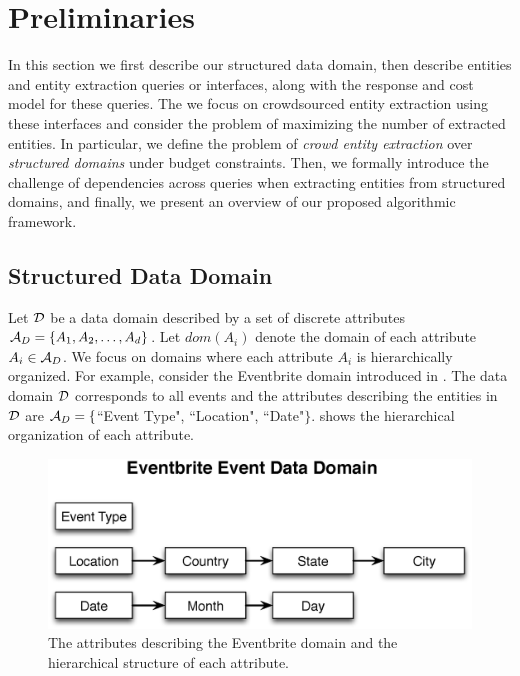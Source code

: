 
\section{Preliminaries}
\label{sec:prelims}
In this section we first describe our structured data domain, then describe entities and entity extraction queries or interfaces, along with the response and cost model for these queries. The we focus on crowdsourced entity extraction using these interfaces and consider the problem of maximizing the number of extracted entities. In particular, we define the problem of {\em crowd entity extraction} over {\em structured domains} under budget constraints. Then, we formally introduce the challenge of dependencies across queries when extracting entities from structured domains, and finally, we present an overview of our proposed algorithmic framework.


\subsection{Structured Data Domain}
\label{sec:data-domain}

Let $\mathcal{D}$ be a data domain described by a set of discrete attributes $\mathcal{A}_D = \{A_1, A_2, \dots, A_d\}$. Let $dom(A_i)$ denote the domain of each attribute $A_i  \in \mathcal{A}_D$. We focus on domains where each attribute $A_i$ is hierarchically organized. For example, consider the Eventbrite domain introduced in . The data domain $\mathcal{D}$ corresponds to all events and the attributes describing the entities in $\mathcal{D}$ are $\mathcal{A}_D = \{$``Event Type", ``Location", ``Date"$\}$.  shows the hierarchical organization of each attribute.

\begin{figure}[h]
	\begin{center}
	\includegraphics[clip,scale=0.4]{figs/eventsDomain.eps}
	\caption{The attributes describing the Eventbrite domain and the hierarchical structure of each attribute.}
	\label{fig:eventsdomain}
	\end{center}
	\vspace{-10pt}
\end{figure}

